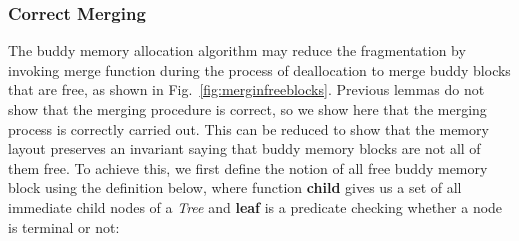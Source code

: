 \subsubsection{Correct Merging}
%
%
%

The buddy memory allocation algorithm may reduce the fragmentation by invoking merge function during the process of deallocation to merge buddy blocks that are free, as shown in Fig.~\ref{fig:merginfreeblocks}. Previous lemmas do not show that the merging procedure is correct, so we show here that the merging process is correctly carried out. This can be reduced to show that the memory layout preserves an invariant saying that buddy memory blocks are not all of them free. To achieve this, we first define the notion of all free buddy memory block using the definition below, where
function \textbf{child} gives us a set of all immediate child nodes of a \emph{Tree} and \textbf{leaf} is a predicate checking whether a node is terminal or not:

